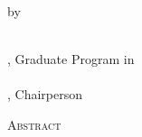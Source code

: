 \clearpage
\centering
\vspace*{-\toptafiddle}

\thetitle \\
by \\
\theauthor \\

\vfill

\thedegree, Graduate Program in \thefield \\
\theuniversity \\
\thechair, Chairperson \\
\thedate

\vfill

\textsc{Abstract}

\justify

\enlargethispage{\bottafiddle}
\clearpage
